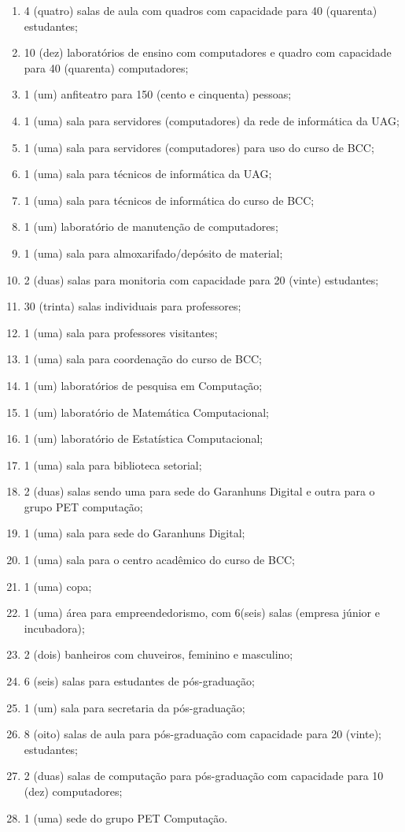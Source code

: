 \documentclass[
	12pt,				%
	openright,			%
  oneside,     %
	a4paper,			%
	english,			%
	french,				%
	spanish,			%
	brazil				%
	]{abntex2}
\begin{document}
\begin{enumerate}
  \item 4 (quatro) salas de aula com quadros com capacidade para 40 (quarenta)
  estudantes;
  \item 10 (dez) laboratórios de ensino com computadores e quadro com capacidade
  para 40 (quarenta) computadores;
  \item 1 (um) anfiteatro para 150 (cento e cinquenta) pessoas;
  \item 1 (uma) sala para servidores (computadores) da rede de informática da
  UAG;
  \item 1 (uma) sala para servidores (computadores) para uso do curso de BCC;
  \item 1 (uma) sala para técnicos de informática da UAG;
  \item 1 (uma) sala para técnicos de informática do curso de BCC;
  \item 1 (um) laboratório de manutenção de computadores;
  \item 1 (uma) sala para almoxarifado/depósito de material;
  \item 2 (duas) salas para monitoria com capacidade para 20 (vinte) estudantes;
  \item 30 (trinta) salas individuais para professores;
  \item 1 (uma) sala para professores visitantes;
  \item 1 (uma) sala para coordenação do curso de BCC;
  \item 1 (um) laboratórios de pesquisa em Computação;
  \item 1 (um) laboratório de Matemática Computacional;
  \item 1 (um) laboratório de Estatística Computacional;
  \item 1 (uma) sala para biblioteca setorial;
  \item 2 (duas) salas sendo uma para sede do Garanhuns Digital e outra para o
  grupo PET computação;
  \item 1 (uma) sala para sede do Garanhuns Digital;
  \item 1 (uma) sala para o centro acadêmico do curso de BCC;
  \item 1 (uma) copa;
  \item 1 (uma) área para empreendedorismo, com 6(seis) salas (empresa júnior e
  incubadora);
  \item 2 (dois) banheiros com chuveiros, feminino e masculino; 
  \item 6 (seis) salas para estudantes de pós-graduação;
  \item 1 (um) sala para secretaria da pós-graduação;
  \item 8 (oito) salas de aula para pós-graduação com capacidade para 20
  (vinte); estudantes;
  \item 2 (duas) salas de computação para pós-graduação com capacidade para 10
  (dez) computadores;
  \item 1 (uma) sede do grupo PET Computação.
\end{enumerate}
\end{document}
